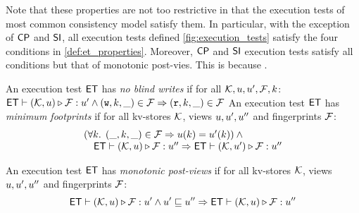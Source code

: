 Note that these properties are not too restrictive in that the execution tests of most common consistency model satisfy them. 
In particular, with the exception of $\mathsf{CP}$ and $\mathsf{SI}$, all execution tests defined \cref{fig:execution_tests} satisfy the four conditions in \cref{def:et_properties}. 
Moreover, $\mathsf{CP}$ and $\mathsf{SI}$ execution tests satisfy all conditions but that of monotonic post-vies. 
This is because \todo.


\begin{definition}[$\ET$ properties]
\label{def:noblidwrites}
\label{def:et-minimum-footprint}
\label{def:et-continuous-postview}
\label{def:et_properties}
An execution test $\ET$ has \emph{no blind writes} if
for all $\mathcal{K}, u, u', \mathcal{F}, k$:\\
\indent
$
\mathsf{ET} \vdash (\mathcal{K}, u) \triangleright \mathcal{F}: u' 
\land (\textnormal{\texttt w}, k, \_) \in \mathcal{F}
\Rightarrow (\textnormal{\texttt r}, k, \_) \in \mathcal{F}
$
An execution test $\ET$ has \emph{minimum footprints} if for all kv-stores $\mathcal{K}$,
views $u, u',u''$ and fingerprints $\mathcal{F}$: 
%
\[
\begin{array}{@{}l@{}}
    ( \fora{ \ke} (\stub, \ke, \stub) \in \f \implies \vi(\ke) = \vi'(\ke) ) \land {} \\
    \quad \ET \vdash (\hh, \vi) \triangleright \opset : \vi'' \implies \ET \vdash (\hh, \vi') \triangleright \opset : \vi''
\end{array}
\]
%

An execution test $\ET$ has \emph{monotonic post-views} if 
for all kv-stores $\mathcal{K}$, 
views $u, u',u''$ and fingerprints $\mathcal{F}$:
\[
    \mathsf{ET} \vdash (\mathcal{K}, u) \triangleright \mathcal{F} : u' 
    \land u' \sqsubseteq u'' 
    \Rightarrow 
    \mathsf{ET} \vdash (\mathcal{K}, u) \triangleright \mathcal{F} : u''
\]


\end{definition}
